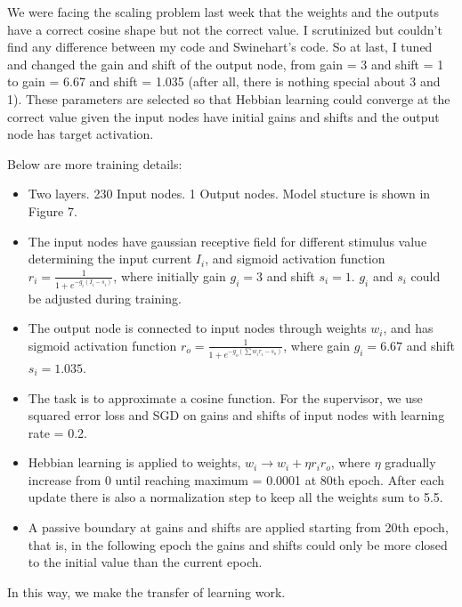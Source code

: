 \documentclass[12pt, a4paper]{article}
\begin{document}
We were facing the scaling problem last week that the weights and the outputs have a correct cosine shape but not the correct value. I scrutinized but couldn't find any difference between my code and Swinehart's code. So at last, I tuned and changed the gain and shift of the output node, from gain = 3 and shift = 1 to gain = 6.67 and shift = 1.035 (after all, there is nothing special about 3 and 1). These parameters are selected so that Hebbian learning could converge at the correct value given the input nodes have initial gains and shifts and the output node has target activation.

Below are more training details:
\begin{itemize}
    \item Two layers. 230 Input nodes. 1 Output nodes. Model stucture is shown in Figure 7.
    \item The input nodes have gaussian receptive field for different stimulus value determining the input current $I_i$, and sigmoid activation function $r_i = \frac{1}{1 + e^{-g_i(I_i-s_i)}}$, where initially gain $g_i = 3$ and shift $s_i = 1$. $g_i$ and $s_i$ could be adjusted during training.
    \item The output node is connected to input nodes through weights $w_i$, and has sigmoid activation function $r_o = \frac{1}{1 + e^{-g_o(\sum w_ir_i - s_o)}}$, where gain $g_i = 6.67$ and shift $s_i = 1.035$.
    \item The task is to approximate a cosine function. For the supervisor, we use squared error loss and SGD on gains and shifts of input nodes with learning rate = 0.2.
    \item Hebbian learning is applied to weights, $w_i \rightarrow w_i + \eta r_i r_o$, where $\eta$ gradually increase from 0 until reaching maximum = 0.0001 at 80th epoch. After each update there is also a normalization step to keep all the weights sum to 5.5.
    \item A passive boundary at gains and shifts are applied starting from 20th epoch, that is, in the following epoch the gains and shifts could only be more closed to the initial value than the current epoch.
\end{itemize}

In this way, we make the transfer of learning work.
\end{document}
